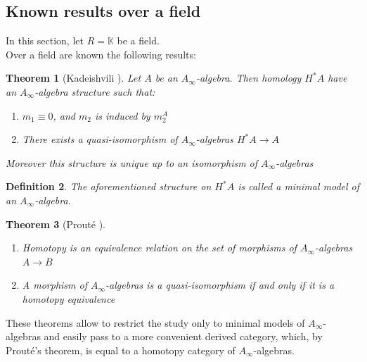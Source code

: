 \documentclass[a4paper, 12pt, openany, fleqn]{amsart}
\newtheorem{theorem}{Theorem}[section]
\newtheorem{definition}[theorem]{Definition}
\begin{document}
\subsection{Known results over a field}
In this section, let $R=\mathbb{K}$ be a field.\\
Over a field are known the following results:
\begin{theorem}[Kadeishvili \cite{MR720689}]
    Let $A$ be an $A_\infty$-algebra. Then homology $H^*A$ have an $A_\infty$-algebra structure such that:
    \begin{enumerate}
        \item $m_1\equiv0$, and $m_2$ is induced by $m_2^A$
        \item There exists a quasi-isomorphism of $A_\infty$-algebras $H^*A\longrightarrow A$
    \end{enumerate}
    Moreover this structure is unique up to an isomorphism of $A_\infty$-algebras
\end{theorem}
\begin{definition}
    The aforementioned structure on $H^*A$ is called a minimal model of an $A_\infty$-algebra.
\end{definition}
\begin{theorem}[Prouté \cite{prout1986}]
    \begin{enumerate}
        \item Homotopy is an equivalence relation on the set of morphisms of $A_\infty$-algebras $A\longrightarrow B$
        \item A morphism of $A_\infty$-algebras is a quasi-isomorphism if and only if it is a homotopy equivalence
    \end{enumerate}
\end{theorem}
These theorems allow to restrict the study only to minimal models of $A_\infty$-algebras and easily pass to a more convenient derived category, which, by Prouté's theorem, is equal to a homotopy category of $A_\infty$-algebras.
\end{document}
